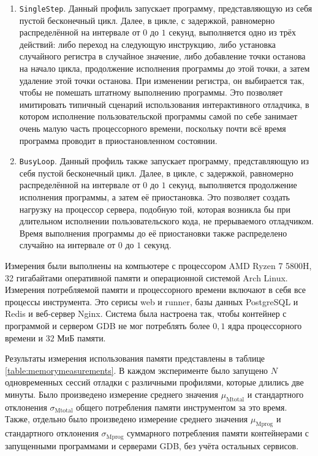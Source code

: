 \documentclass[a4paper,article,14pt]{extarticle}
\begin{document}
\begin{enumerate}
    \item \texttt{SingleStep}. Данный профиль запускает программу, представляющую из себя пустой бесконечный цикл. Далее, в цикле, с задержкой, равномерно распределённой на интервале от $0$ до $1$ секунд, выполняется одно из трёх действий: либо переход на следующую инструкцию, либо установка случайного регистра в случайное значение, либо добавление точки останова на начало цикла, продолжение исполнения программы до этой точки, а затем удаление этой точки останова. При изменении регистра, он выбирается так, чтобы не помешать штатному выполнению программы. Это позволяет имитировать типичный сценарий использования интерактивного отладчика, в котором исполнение пользовательской программы самой по себе занимает очень малую часть процессорного времени, поскольку почти всё время программа проводит в приостановленном состоянии.
    \item \texttt{BusyLoop}. Данный профиль также запускает программу, представляющую из себя пустой бесконечный цикл. Далее, в цикле, с задержкой, равномерно распределённой на интервале от $0$ до $1$ секунд, выполняется продолжение исполнения программы, а затем её приостановка. Это позволяет создать нагрузку на процессор сервера, подобную той, которая возникла бы при длительном исполнении пользовательского кода, не прерываемого отладчиком. Время выполнения программы до её приостановки также распределено случайно на интервале от $0$ до $1$ секунд.
\end{enumerate}

Измерения были выполнены на компьютере с процессором AMD Ryzen 7 5800H, 32 гигабайтами оперативной памяти и операционной системой Arch Linux. Измерения потребляемой памяти и процессорного времени включают в себя все процессы инструмента. Это серисы web и runner, базы данных PostgreSQL и Redis и веб-сервер Nginx. Система была настроена так, чтобы контейнер с программой и сервером GDB не мог потреблять более $0{,}1$ ядра процессорного времени и $32$ МиБ памяти.

Результаты измерения использования памяти представлены в таблице \ref{table:memorymeasurements}. В каждом эксперименте было запущено $N$ одновременных сессий отладки с различными профилями, которые длились две минуты. Было произведено измерение среднего значения $\mu_\mathrm{Mtotal}$ и стандартного отклонения $\sigma_\mathrm{Mtotal}$ общего потребления памяти инструментом за это время. Также, отдельно было произведено измерение среднего значения $\mu_{\mathrm{Mprog}}$ и стандартного отклонения $\sigma_\mathrm{Mprog}$ суммарного потребления памяти контейнерами с запущенными программами и серверами GDB, без учёта остальных сервисов.
\end{document}
